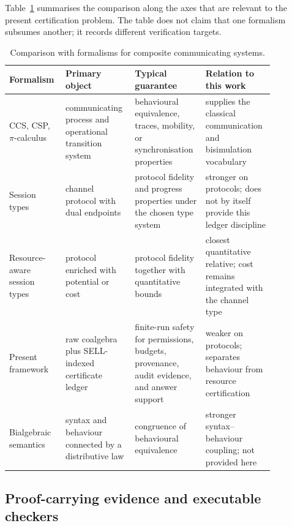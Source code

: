 \documentclass[a4paper,fleqn]{cas-sc}
\begin{document}
Table~\ref{tab:formal-comparison} summarises the comparison along the axes that
are relevant to the present certification problem. The table does not claim
that one formalism subsumes another; it records different verification targets.

\begin{table}[htbp]
\centering
\scriptsize
\begin{tabular}{>{\raggedright\arraybackslash}p{0.17\linewidth}>{\raggedright\arraybackslash}p{0.24\linewidth}>{\raggedright\arraybackslash}p{0.24\linewidth}>{\raggedright\arraybackslash}p{0.21\linewidth}}
\toprule
Formalism & Primary object & Typical guarantee & Relation to this work \\
\midrule
CCS, CSP, \(\pi\)-calculus & communicating process and operational transition system & behavioural equivalence, traces, mobility, or synchronisation properties & supplies the classical communication and bisimulation vocabulary \\
Session types & channel protocol with dual endpoints & protocol fidelity and progress properties under the chosen type system & stronger on protocols; does not by itself provide this ledger discipline \\
Resource-aware session types & protocol enriched with potential or cost & protocol fidelity together with quantitative bounds & closest quantitative relative; cost remains integrated with the channel type \\
Present framework & raw coalgebra plus SELL-indexed certificate ledger & finite-run safety for permissions, budgets, provenance, audit evidence, and answer support & weaker on protocols; separates behaviour from resource certification \\
Bialgebraic semantics & syntax and behaviour connected by a distributive law & congruence of behavioural equivalence & stronger syntax--behaviour coupling; not provided here \\
\bottomrule
\end{tabular}
\caption{Comparison with formalisms for composite communicating systems.}
\label{tab:formal-comparison}
\end{table}

\subsection{Proof-carrying evidence and executable checkers}
\end{document}
